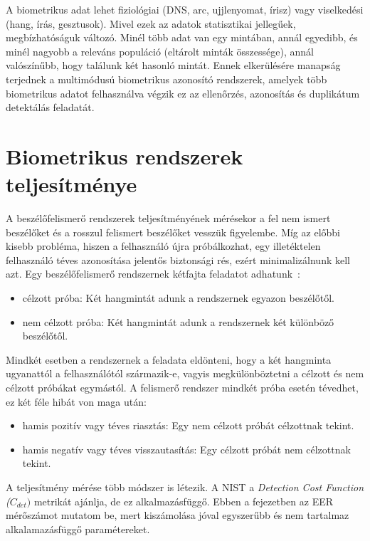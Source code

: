 A biometrikus adat lehet fiziológiai (DNS, arc, ujjlenyomat, írisz) vagy viselkedési (hang, írás, gesztusok). Mivel ezek az adatok statisztikai jellegűek, megbízhatóságuk változó. Minél több adat van egy mintában, annál egyedibb, és minél nagyobb a releváns populáció (eltárolt minták összessége), annál valószínűbb, hogy találunk két hasonló mintát. Ennek elkerülésére manapság terjednek a multimódusú biometrikus azonosító rendszerek, amelyek több biometrikus adatot felhasználva végzik ez az ellenőrzés, azonosítás és duplikátum detektálás feladatát. 

\section{Biometrikus rendszerek teljesítménye}

A beszélőfelismerő rendszerek teljesítményének mérésekor a fel nem ismert beszélőket és a rosszul felismert beszélőket vesszük figyelembe. Míg az előbbi kisebb probléma, hiszen a felhasználó újra próbálkozhat, egy illetéktelen felhasználó téves azonosítása jelentős biztonsági rés, ezért minimalizálnunk kell azt.
\newline
\newline
Egy beszélőfelismerő rendszernek kétfajta feladatot adhatunk~\cite{van_leeuwen_2007}:
\begin{itemize}
	\item célzott próba: Két hangmintát adunk a rendszernek egyazon beszélőtől.
	\item nem célzott próba: Két hangmintát adunk a rendszernek két különböző beszélőtől.
\end{itemize} 

Mindkét esetben a rendszernek a feladata eldönteni, hogy a két hangminta ugyanattól a felhasználótól származik-e, vagyis megkülönböztetni a célzott és nem célzott próbákat egymástól.
A felismerő rendszer mindkét próba esetén tévedhet, ez két féle hibát von maga után:

\begin{itemize}
	\item hamis pozitív vagy téves riasztás: Egy nem célzott próbát célzottnak tekint.
	\item hamis negatív vagy téves visszautasítás: Egy célzott próbát nem célzottnak tekint.
\end{itemize} 

A teljesítmény mérése több módszer is létezik. A NIST a \emph{Detection Cost Function ($C_{det})$} metrikát ajánlja, de ez alkalmazásfüggő. Ebben a fejezetben az EER mérőszámot mutatom be, mert kiszámolása jóval egyszerűbb és nem tartalmaz alkalamazásfüggő paramétereket.

